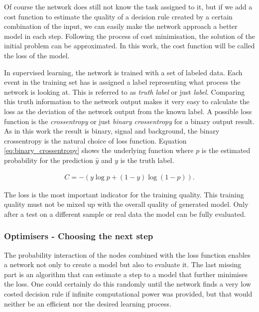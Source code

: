 Of course the network does still not know the task assigned to it, but if we add a cost function to estimate the quality of a decision rule created by a certain combination of the input, we can easily make the network approach a better model in each step. Following the process of cost minimisation, the solution of the initial problem can be approximated.
In this work, the cost function will be called the loss of the model.

In supervised learning, the network is trained with a set of labeled data. Each event in the training set has is assigned a label representing what process the network is looking at. This is referred to as \emph{truth label} or just \emph{label}. Comparing this truth information to the network output makes it very easy to calculate the loss as the deviation of the network output from the known label. A possible loss function is the \emph{crossentropy} or just \emph{binary crossentropy} for a binary output result. As in this work the result is binary, signal and background, the binary crossentropy is the natural choice of loss function. Equation \eqref{eq:binary_crossentropy} shows the underlying function where $p$ is the estimated probability for the prediction $\hat{y}$ and $y$ is the truth label.

\begin{align}
    C = -(y \log p + (1 - y) \log (1 - p) ).
    \label{eq:binary_crossentropy}
\end{align}

The loss is the most important indicator for the training quality. This training quality must not be mixed up with the overall quality of generated model. Only after a test on a different sample or real data the model can be fully evaluated.

\subsubsection{Optimisers - Choosing the next step}
\label{sec:optimisation}

The probability interaction of the nodes combined with the loss function enables a network not only to create a model but also to evaluate it. The last missing part is an algorithm that can estimate a step to a model that further minimises the loss. One could certainly do this randomly until the network finds a very low costed decision rule if infinite computational power was provided, but that would neither be an efficient nor the desired learning process.

